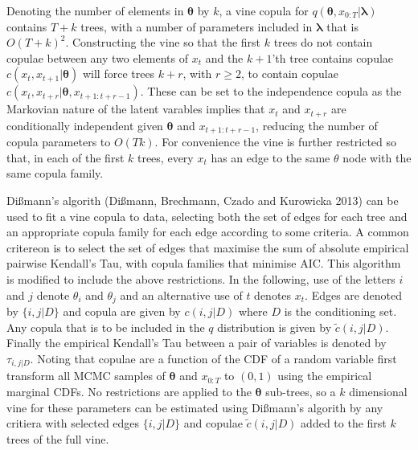 \documentclass[12pt,a4paper]{article}%
\numberwithin{equation}{section}
\begin{document}
Denoting the number of elements in $\boldsymbol{\theta}$ by $k$, a vine copula for $q(\boldsymbol{\theta}, x_{0:T} | \boldsymbol{\lambda})$ contains $T+k$ trees, with a number of parameters included in $\boldsymbol{\lambda}$ that is $O(T+k)^2$. Constructing the vine so that the first $k$ trees do not contain copulae between any two elements of $x_t$ and the $k+1$'th tree contains copulae $c(x_t, x_{t+1} | \boldsymbol{\theta})$ will force trees $k+r$, with $r \geq 2$, to contain copulae $c(x_t, x_{t+r} | \boldsymbol{\theta}, x_{t+1:t+r-1})$. These can be set to the independence copula as the Markovian nature of the latent varables implies that $x_t$ and $x_{t+r}$ are conditionally independent given $\boldsymbol{\theta}$ and $x_{t+1:t+r-1}$, reducing the number of copula parameters to $O(Tk)$. For convenience the vine is further restricted so that, in each of the first $k$ trees, every $x_t$ has an edge to the same $\theta$ node with the same copula family. 

Di{\ss}mann's algorith (Di{\ss}mann, Brechmann, Czado and Kurowicka 2013) can be used to fit a vine copula to data, selecting both the set of edges for each tree and an appropriate copula family for each edge according to some criteria. A common critereon is to select the set of edges that maximise the sum of absolute empirical pairwise Kendall's Tau, with copula families that minimise AIC. This algorithm is modified to include the above restrictions. In the following, use of the letters $i$ and $j$ denote $\theta_i$ and $\theta_j$ and an alternative use of $t$ denotes $x_t$. Edges are denoted by $\{i, j | D \}$ and copula are given by $c(i, j | D)$ where $D$ is the conditioning set. Any copula that is to be included in the $q$ distribution is given by $\tilde{c}(i, j | D)$. Finally the empirical Kendall's Tau between a pair of variables is denoted by $\tau_{i, j | D}$. Noting that copulae are a function of the CDF of a random variable first transform all MCMC samples of $\boldsymbol{\theta}$ and $x_{0:T}$ to $(0, 1)$ using the empirical marginal CDFs. No restrictions are applied to the $\boldsymbol{\theta}$ sub-trees, so a $k$ dimensional vine for these parameters can be estimated using Di{\ss}mann's algorith by any critiera with selected edges $\{i, j | D\}$ and copulae $\tilde{c}(i, j | D)$ added to the first $k$ trees of the full vine. 
\end{document}

